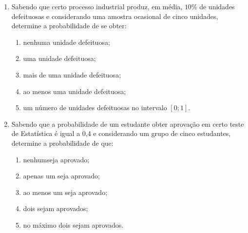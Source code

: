 \begin{enumerate}[resume]
\item Sabendo que certo processo industrial produz, em média, $10\%$ de unidades defeituosas e considerando uma amostra ocasional de cinco unidades, determine a probabilidade de se obter:
	\begin{enumerate}
	\item nenhuma unidade defeituosa;
	\item uma unidade defeituosa;
	\item mais de uma unidade defeituosa;
	\item ao menos uma unidade defeituosa;
	\item um número de unidades defeituosas no intervalo $[0;1]$.
	\end{enumerate}
	
\item Sabendo que a probabilidade de um estudante obter aprovação em certo teste de Estatística é igual a 0,4 e considerando um grupo de cinco estudantes, determine a probabilidade de que: 
	\begin{enumerate}
	\item nenhumseja aprovado;
	\item apenas um seja aprovado;
	\item ao menos um seja aprovado;
	\item dois sejam aprovados;
	\item no máximo dois sejam aprovados.
	\end{enumerate}
	
\end{enumerate}
